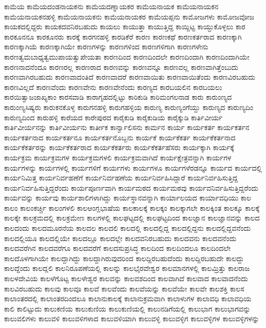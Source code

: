 {ಕಾಮೆಯ
ಕಾಮೆಯದಂಡನಾಯಕನು
ಕಾಮೆಯದಣ್ನಾಯಕರ
ಕಾಮೆಯನಾಯಕ
ಕಾಮೆಯನಾಯಕನ
ಕಾಮೆಯನಾಯಕನಹಳ್ಳಿ
ಕಾಮೆಯನಾಯಕನು
ಕಾಮೆಯನಾಯಕರ
ಕಾಮೆಯಪ್ಪನು
ಕಾಮೋಜಗಳು
ಕಾಮೋಜವೋಜ
ಕಾಯಕದಲ್ಲಿದ್ದರು
ಕಾಯಕದವನಿರಬಹುದು
ಕಾಯಲು
ಕಾಯುತ್ತಾ
ಕಾಯುತ್ತಿದ್ದ
ಕಾಯ್ದಿಟ್ಟ
ಕಾಯ್ದುಕೊಳ್ಳಲು
ಕಾರ
ಕಾರಕೂನನೂ
ಕಾರಕೂನರು
ಕಾರಕ್ಕೆ
ಕಾರಗನಹಳ್ಳಿ
ಕಾರಡಿಕೆರೆ
ಕಾರಣ
ಕಾರಣಕಥೆ
ಕಾರಣಕರ್ತರಾದ
ಕಾರಣಕ್ಕಾಗಿ
ಕಾರಣಕ್ಕಾಗಿಯೆ
ಕಾರಣಕ್ಕಾಗಿಯೇ
ಕಾರಣಗಳನ್ನು
ಕಾರಣಗಳಿಂದ
ಕಾರಣಗಳಿಗಾಗಿ
ಕಾರಣಗಳೇನು
ಕಾರಣತ್ವಮಬಾಧ್ಯತ್ವಮುಪಾಯತ್ವುಪೇಯತಾ
ಕಾರಣದಿಂದ
ಕಾರಣದಿಂದಲೇ
ಕಾರಣದಿಂದಾಗಿ
ಕಾರಣದಿಂದಾಗಿಯೇ
ಕಾರಣನಾದನೆಂದೂ
ಕಾರಣರಲ್ಲ
ಕಾರಣರಾದ
ಕಾರಣವನ್ನು
ಕಾರಣವನ್ನೂ
ಕಾರಣವಲ್ಲ
ಕಾರಣವಾಗಿತ್ತೆಂಬುದು
ಕಾರಣವಾಗಿರಬಹುದು
ಕಾರಣವಾದಂತಿದೆ
ಕಾರಣವಾದರೆ
ಕಾರಣವಾಯಿತು
ಕಾರಣವಾಯಿತೆಂದು
ಕಾರಣವಿರಬಹುದು
ಕಾರಣವಿಲ್ಲದೆ
ಕಾರಣವೆಂದು
ಕಾರಣವೇನು
ಕಾರಣವೇನೆಂದು
ಕಾರಣ್ಯದ
ಕಾರಬಯಲಿನ
ಕಾರಬಯಲು
ಕಾರಯಿತ್ವಾಜಜಾಖ್ಯಕಾಂ
ಕಾರಸವಾಡಿ
ಕಾರಾಗೃಹದಲ್ಲಿಟ್ಟು
ಕಾರಿಕುಡಿ
ಕಾರಿಮಂಗಲನಾಡ
ಕಾರು
ಕಾರುಂಣ್ಯದ
ಕಾರುಂಣ್ಯಸಿಷ್ಯರು
ಕಾರುಕನಕೊಳ್ಳ
ಕಾರುಗನಹಳ್ಳಿ
ಕಾರುಗಹಳ್ಳಿಯ
ಕಾರುಣ್ಯ
ಕಾರುಣ್ಯಂಗೆಯ್ದು
ಕಾರುಣ್ಯದ
ಕಾರುಣ್ಯದಿಂ
ಕಾರುಣ್ಯದಿಂದ
ಕಾರುಹಳ್ಳಿ
ಕಾರೆಯದ
ಕಾರೇಪುರದ
ಕಾರೈಕುಡಿ
ಕಾರೈಕುಡಿಯ
ಕಾರೈಕ್ಕುಡಿ
ಕಾರ್ತಿವೀರ್ಯ
ಕಾರ್ತಿವೀರ್ಯನನ್ನು
ಕಾರ್ತಿವೀರ್ಯನು
ಕಾರ್ತೀಕ
ಕಾರ್ನ್ವಾಲಿಸನು
ಕಾರ್ಮನ
ಕಾರ್ಯ
ಕಾರ್ಯಕರ್ತ
ಕಾರ್ಯಕರ್ತನ
ಕಾರ್ಯಕರ್ತನಾದ
ಕಾರ್ಯಕರ್ತನೂ
ಕಾರ್ಯಕರ್ತನೊಬ್ಬನು
ಕಾರ್ಯಕೆ
ಕಾರ್ಯಕೆಕರ್ತ
ಕಾರ್ಯಕೆಕರ್ತನಾದ
ಕಾರ್ಯಕೆಕರ್ತರನ್ನು
ಕಾರ್ಯಕೆಕರ್ತರಾದ
ಕಾರ್ಯಕೆಕರ್ತರು
ಕಾರ್ಯಕೆಕರ್ತಹೆಸರು
ಕಾರ್ಯಕ್ಕಾಗಿ
ಕಾರ್ಯಕ್ಕೆ
ಕಾರ್ಯಕ್ರಮ
ಕಾರ್ಯಕ್ರಮಗಳ
ಕಾರ್ಯಕ್ರಮಗಳಲಿ
ಕಾರ್ಯಕ್ರಮವಾಗಿದೆ
ಕಾರ್ಯಕ್ಷೇತ್ರವನ್ನಾಗಿ
ಕಾರ್ಯಗಳ
ಕಾರ್ಯಗಳನ್ನು
ಕಾರ್ಯಗಳಲ್ಲಿ
ಕಾರ್ಯಗಳಿಗೆ
ಕಾರ್ಯಗಳು
ಕಾರ್ಯಗಳೂ
ಕಾರ್ಯಗಳೆರಡನ್ನೂ
ಕಾರ್ಯದ
ಕಾರ್ಯದಲ್ಲಿ
ಕಾರ್ಯನಿಮಿತ್ತ
ಕಾರ್ಯನಿರ್ವಹಣೆಗೆ
ಕಾರ್ಯನಿರ್ವಹಣೆಯ
ಕಾರ್ಯನಿರ್ವಹಿಸಿದ್ದಾರೆ
ಕಾರ್ಯನಿರ್ವಹಿಸುತ್ತಿದ್ದ
ಕಾರ್ಯನಿರ್ವಹಿಸುತ್ತಿದ್ದರೆಂದು
ಕಾರ್ಯಪೂರ್ಣವಾಗಿ
ಕಾರ್ಯಮಠದ
ಕಾರ್ಯಮಠವು
ಕಾರ್ಯವನಿರ್ವಹಿಸುತ್ತಿದ್ದರೆಂದು
ಕಾರ್ಯವನ್ನು
ಕಾರ್ಯವು
ಕಾರ್ಯಶಾಲಿಗಳಾಗಿದ್ದು
ಕಾರ್ಯಸ್ಥಾನವನ್ನಾಗಿ
ಕಾರ್ಯಾಲಯದ
ಕಾರ್ಯಾವಧಿಯು
ಕಾಲ
ಕಾಲಂ
ಕಾಲಂಕರ್ಚ್ಚಿ
ಕಾಲಂಗಳಲಿ
ಕಾಲಆಂಗ್ಲಭಾಷೆಯ
ಕಾಲಕಾಲಕ್ಕೆ
ಕಾಲಕ್ಕಂ
ಕಾಲಕ್ಕಾಗಲೇ
ಕಾಲಕ್ಕಿಂತ
ಕಾಲಕ್ಕೂ
ಕಾಲಕ್ಕೆ
ಕಾಲಕ್ಕೇ
ಕಾಲಕ್ರಮದಲ್ಲಿ
ಕಾಲಕ್ರಮೇಣ
ಕಾಲಗಳಲ್ಲಿ
ಕಾಲಘಟ್ಟದಲ್ಲಿ
ಕಾಲಘಟ್ಟದಿಂದ
ಕಾಲಜ್ಞಾನ
ಕಾಲಜ್ಞಾನವನ್ನು
ಕಾಲದ
ಕಾಲದಂದು
ಕಾಲದಮೂರನೆಯ
ಕಾಲದಲ
ಕಾಲದಲಿ
ಕಾಲದಲ್ಲಿ
ಕಾಲದಲ್ಲಿದ್ದ
ಕಾಲದಲ್ಲಿದ್ದನು
ಕಾಲದಲ್ಲಿದ್ದವನೆಂದು
ಕಾಲದಲ್ಲಿಯೂ
ಕಾಲದಲ್ಲಿಯೇ
ಕಾಲದಲ್ಲೂ
ಕಾಲದಲ್ಲೇ
ಕಾಲದವನಿರಬಹುದು
ಕಾಲದವನು
ಕಾಲದವನೆಂದು
ಕಾಲದವರೆಗಿನ
ಕಾಲದವರೆಗೂ
ಕಾಲದವರೆಗೆ
ಕಾಲದಸುಪ್ರಸಿದ್ಧ
ಕಾಲದಿಂದ
ಕಾಲದಿಂದಲೂ
ಕಾಲದಿಂದಲೇ
ಕಾಲದೊಳಗಾಗಿಯೇ
ಕಾಲದ್ದಾಗಿದ್ದು
ಕಾಲದ್ದಾಗಿರುವುದರಿಂದ
ಕಾಲದ್ದಿರಬಹುದೆಂದು
ಕಾಲದ್ದಿರಬಹುದೇ
ಕಾಲದ್ದು
ಕಾಲದ್ದೆಂದು
ಕಾಲದ್ಲಲಿ
ಕಾಲನಿರೂಪಣೆಯಲ್ಲಿ
ಕಾಲನ್ನು
ಕಾಲಭೈರವೇಶ್ವರ
ಕಾಲಮಾನಗಳಲ್ಲಿ
ಕಾಲಮ್ರಿತ್ತು
ಕಾಲರಾಜ
ಕಾಲಳದೇವಿಯ
ಕಾಲಳೆಗೊಟ್ಟ
ಕಾಲಳೇಶ್ವರ
ಕಾಲವನ್ನು
ಕಾಲವಶದಿಂದ
ಕಾಲವಾಗಿದೆ
ಕಾಲವಾದ
ಕಾಲವಾದನೆಂದು
ಕಾಲವಿರಬಹುದು
ಕಾಲವು
ಕಾಲವೂ
ಕಾಲವೆ
ಕಾಲವೆಂದು
ಕಾಲವೆಯನ್ನು
ಕಾಲವೆಯೇ
ಕಾಲವೇ
ಕಾಲಶಕ್ತಿ
ಕಾಲಸ
ಕಾಲಾಂತರದಲ್ಲಿ
ಕಾಲಾಂತರದಿಂದಲೂ
ಕಾಲಾನುಕಾಲಕ್ಕೆ
ಕಾಲಾನುಕ್ರಮವಾಗಿ
ಕಾಲಾಳುಗಳ
ಕಾಲಾವಧಿ
ಕಾಲಾವಧಿಯ
ಕಾಲಿ
ಕಾಲಿಟ್ಟುದು
ಕಾಲುಕಣಿಯ
ಕಾಲುಕುಣಿಯ
ಕಾಲುಕುಣಿಯಲ್ಲಿ
ಕಾಲುನಡಿಗೆಯಲ್ಲಿ
ಕಾಲುಭಾಗ
ಕಾಲುಭಾಗವನ್ನು
ಕಾಲುವಲಿಗಳು
ಕಾಲುವಳಿ
ಕಾಲುವಳಿಗಳಾದ
ಕಾಲುವಳಿಯಾಗಿ
ಕಾಲುವಳ್ಳಿ
ಕಾಲುವಳ್ಳಿಗ
ಕಾಲುವಳ್ಳಿಗಳ
ಕಾಲುವಳ್ಳಿಗಳನ್ನು
}
